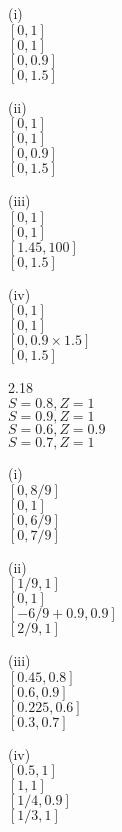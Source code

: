 (i) \\
$\boxed{[0,1]}$ \\
$\boxed{[0,1]}$ \\
$\boxed{[0,0.9]}$ \\
$\boxed{[0,1.5]}$

(ii) \\
$\boxed{[0,1]}$ \\
$\boxed{[0,1]}$ \\
$\boxed{[0,0.9]}$ \\
$\boxed{[0,1.5]}$

(iii) \\
$\boxed{[0,1]}$ \\
$\boxed{[0,1]}$ \\
$\boxed{[1.45,100]}$ \\
$\boxed{[0,1.5]}$

(iv) \\
$\boxed{[0,1]}$ \\
$\boxed{[0,1]}$ \\
$\boxed{[0,0.9 \times 1.5]}$ \\
$\boxed{[0,1.5]}$

2.18 \\

$S=0.8,Z=1$ \\
$S=0.9,Z=1$ \\
$S=0.6,Z=0.9$ \\
$S=0.7,Z=1$

(i) \\
$\boxed{[0,8/9]}$ \\
$\boxed{[0,1]}$ \\
$\boxed{[0,6/9]}$ \\
$\boxed{[0,7/9]}$

(ii) \\
$\boxed{[1/9,1]}$ \\
$\boxed{[0,1]}$ \\
$\boxed{[-6/9+0.9,0.9]}$ \\
$\boxed{[2/9,1]}$

(iii) \\
$\boxed{[0.45,0.8]}$ \\
$\boxed{[0.6,0.9]}$ \\
$\boxed{[0.225,0.6]}$ \\
$\boxed{[0.3,0.7]}$

(iv) \\
$\boxed{[0.5,1]}$ \\
$\boxed{[1,1]}$ \\
$\boxed{[1/4,0.9]}$ \\
$\boxed{[1/3,1]}$

